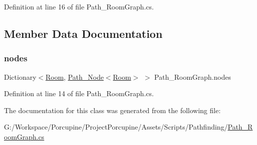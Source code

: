 Definition at line 16 of file Path\+\_\+\+Room\+Graph.\+cs.



\subsection{Member Data Documentation}
\mbox{\label{class_path___room_graph_a45a24066fd1d3d31bc1f62053aa62fc1}} 
\subsubsection{\texorpdfstring{nodes}{nodes}}
{\footnotesize\ttfamily Dictionary$<$\hyperlink{class_project_porcupine_1_1_rooms_1_1_room}{Room}, \hyperlink{class_path___node}{Path\+\_\+\+Node}$<$\hyperlink{class_project_porcupine_1_1_rooms_1_1_room}{Room}$>$ $>$ Path\+\_\+\+Room\+Graph.\+nodes}



Definition at line 14 of file Path\+\_\+\+Room\+Graph.\+cs.



The documentation for this class was generated from the following file\+:\begin{DoxyCompactItemize}
\item 
G\+:/\+Workspace/\+Porcupine/\+Project\+Porcupine/\+Assets/\+Scripts/\+Pathfinding/\hyperlink{_path___room_graph_8cs}{Path\+\_\+\+Room\+Graph.\+cs}\end{DoxyCompactItemize}
